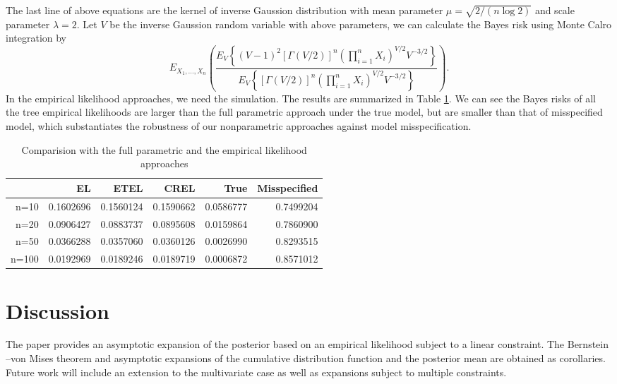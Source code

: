 { The last line of above equations are the kernel of inverse Gaussion distribution with mean parameter $\mu=\sqrt{2/(n\log 2)}$ and scale parameter $\lambda=2$. 
 Let $V$ be the inverse Gaussion random variable with above parameters,
 we can calculate the Bayes risk using Monte Calro integration by 
 \[ 	E_{X_1,\ldots,X_n} \left ( 	\frac{E_V\left\{ \left(V-1\right )^2 \left[\Gamma\left(V/2\right)\right]^n \left(\prod_{i=1}^n X_i \right)^{V/2} V^{-3/2}\right\}}{E_V \left\{\left[\Gamma\left(V/2\right)\right]^n \left(\prod_{i=1}^n X_i \right)^{V/2} V^{-3/2}\right\}} 	\right).  \]
 In the empirical likelihood approaches, we need the simulation. The results are summarized in Table \ref{tab:cmp-parm-el}.
 We can see the Bayes risks of all the tree empirical likelihoods are larger than the full parametric approach under the true model,
but are smaller than that of misspecified model,
which substantiates the robustness of our nonparametric approaches against model misspecification. 
  
\begin{table}[ht] \centering \begin{tabular}{rrrrrr}   \hline  & EL & ETEL & CREL & True & Misspecified\\    \hline n=10 & 0.1602696 & 0.1560124 & 0.1590662 & 0.0586777 & 0.7499204 \\    n=20 & 0.0906427 & 0.0883737 & 0.0895608 & 0.0159864 & 0.7860900 \\    n=50 & 0.0366288 & 0.0357060 & 0.0360126 & 0.0026990 & 0.8293515\\    n=100 & 0.0192969 & 0.0189246 & 0.0189719 & 0.0006872 & 0.8571012 \\     \hline \end{tabular} 
\caption{Comparision with the full parametric and the empirical likelihood approaches} 
\label{tab:cmp-parm-el} \end{table}

}
 
\section{Discussion}
The paper provides an asymptotic expansion of the posterior based on an empirical likelihood subject to a linear constraint. The Bernstein --von Mises theorem and asymptotic expansions of the cumulative distribution function and the posterior mean are obtained as corollaries. Future work will include an extension to the multivariate case as well as expansions subject to multiple constraints. 

